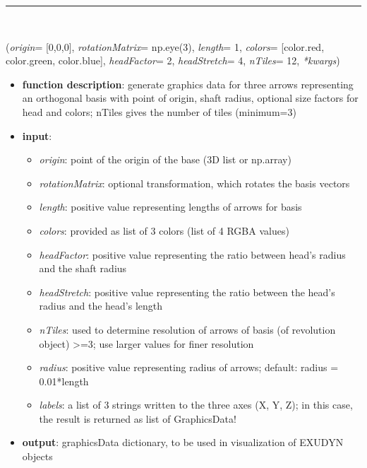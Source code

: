 \begin{itemize}[leftmargin=1.4cm]
\begin{itemize}[leftmargin=1.4cm]
\begin{itemize}[leftmargin=1.4cm]
\begin{itemize}[leftmargin=0.5cm]
\begin{itemize}[leftmargin=1.4cm]
\begin{itemize}[leftmargin=1.4cm]
\begin{itemize}[leftmargin=1.4cm]
\begin{itemize}[leftmargin=0.5cm]
\begin{itemize}[leftmargin=1.4cm]
%
\noindent\rule{8cm}{0.75pt}\vspace{1pt} \\ 
\begin{flushleft}
\label{sec:graphics:Basis}
({\it origin}= [0,0,0], {\it rotationMatrix}= np.eye(3), {\it length}= 1, {\it colors}= [color.red, color.green, color.blue], {\it headFactor}= 2, {\it headStretch}= 4, {\it nTiles}= 12, {\it **kwargs})
\end{flushleft}
\setlength{\itemindent}{0.7cm}
\begin{itemize}[leftmargin=0.7cm]
\item[--]
{\bf function description}: generate graphics data for three arrows representing an orthogonal basis with point of origin, shaft radius, optional size factors for head and colors; nTiles gives the number of tiles (minimum=3)
\item[--]
{\bf input}: \vspace{-6pt}
\begin{itemize}[leftmargin=1.2cm]
\setlength{\itemindent}{-0.7cm}
\item[]{\it origin}: point of the origin of the base (3D list or np.array)
\item[]{\it rotationMatrix}: optional transformation, which rotates the basis vectors
\item[]{\it length}: positive value representing lengths of arrows for basis
\item[]{\it colors}: provided as list of 3 colors (list of 4 RGBA values)
\item[]{\it headFactor}: positive value representing the ratio between head's radius and the shaft radius
\item[]{\it headStretch}: positive value representing the ratio between the head's radius and the head's length
\item[]{\it nTiles}: used to determine resolution of arrows of basis (of revolution object) >=3; use larger values for finer resolution
\item[]{\it radius}: positive value representing radius of arrows; default: radius = 0.01*length
\item[]{\it labels}: a list of 3 strings written to the three axes (X, Y, Z); in this case, the result is returned as list of GraphicsData!
\end{itemize}
\item[--]
{\bf output}: graphicsData dictionary, to be used in visualization of EXUDYN objects

\end{itemize}
\end{itemize}
\end{itemize}
\end{itemize}
\end{itemize}
\end{itemize}
\end{itemize}
\end{itemize}
\end{itemize}
\end{itemize}
